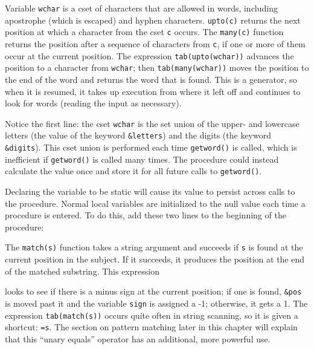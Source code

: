 Variable \texttt{wchar} is a cset of characters that are
allowed in words, including apostrophe (which is escaped) and hyphen
characters. \texttt{upto(c)} returns the next position
at which a character from the cset \texttt{c} occurs. The
\texttt{many(c)} function returns the position after a
sequence of characters from \texttt{c}, if one or more of them occur at
the current position. The expression \texttt{tab(upto(wchar))} advances
the position to a character from \texttt{wchar}; then
\texttt{tab(many(wchar))} moves the position to the end of the word and
returns the word that is found. This is a generator, so when it is
resumed, it takes up execution from where it left off and continues to
look for words (reading the input as necessary).

Notice the first line: the cset \texttt{wchar} is the set union of the
upper- and lowercase letters (the value of the keyword
\texttt{\&letters}) and the digits (the keyword \texttt{\&digits}).
This cset union is performed each time \texttt{getword()} is called,
which is inefficient if \texttt{getword()} is called many times. The
procedure could instead calculate the value once and store it for all
future calls to \texttt{getword()}.

Declaring the variable to be static will cause its value to
persist across calls to the procedure. Normal local variables are
initialized to the null value each time a procedure is entered. To do
this, add these two lines to the beginning of the procedure:


The \texttt{match(s)} function takes a string argument
and succeeds if \texttt{s} is found at the current position in the
subject. If it succeeds, it produces the position at the end of the
matched substring. This expression


\noindent
looks to see if there is a minus sign at the current position; if one is
found, \texttt{\&pos} is moved past it and the variable \texttt{sign}
is assigned a -1; otherwise, it gets a 1. The expression
\texttt{tab(match(s))} occurs quite often in string scanning, so it is
given a shortcut: \texttt{=s}.  The section on pattern matching
later in this chapter will explain that this
``unary equals'' operator has an additional, more powerful use.

